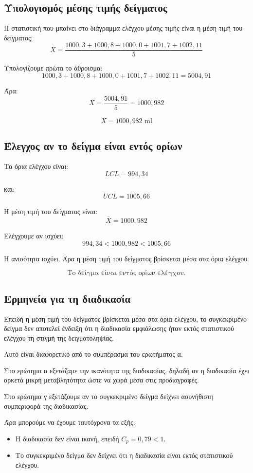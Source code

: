 \documentclass[12pt,a4paper]{article}
\begin{document}
\subsection{Υπολογισμός μέσης τιμής δείγματος}

Η στατιστική που μπαίνει στο διάγραμμα ελέγχου μέσης τιμής είναι η μέση τιμή του δείγματος:
\[
\bar{X}=\frac{1000{,}3+1000{,}8+1000{,}0+1001{,}7+1002{,}11}{5}
\]

Υπολογίζουμε πρώτα το άθροισμα:
\[
1000{,}3+1000{,}8+1000{,}0+1001{,}7+1002{,}11=5004{,}91
\]

Άρα:
\[
\bar{X}=\frac{5004{,}91}{5}=1000{,}982
\]

\[
\boxed{\bar{X}=1000{,}982 \text{ ml}}
\]

\subsection{Έλεγχος αν το δείγμα είναι εντός ορίων}

Τα όρια ελέγχου είναι:
\[
LCL=994{,}34
\]

και:
\[
UCL=1005{,}66
\]

Η μέση τιμή του δείγματος είναι:
\[
\bar{X}=1000{,}982
\]

Ελέγχουμε αν ισχύει:
\[
994{,}34 < 1000{,}982 < 1005{,}66
\]

Η ανισότητα ισχύει. Άρα η μέση τιμή του δείγματος βρίσκεται μέσα στα όρια ελέγχου.

\[
\boxed{\text{Το δείγμα είναι εντός ορίων ελέγχου.}}
\]

\subsection{Ερμηνεία για τη διαδικασία}

Επειδή η μέση τιμή του δείγματος βρίσκεται μέσα στα όρια ελέγχου, το συγκεκριμένο δείγμα δεν αποτελεί ένδειξη ότι η διαδικασία εμφιάλωσης ήταν εκτός στατιστικού ελέγχου τη στιγμή της δειγματοληψίας.

Αυτό είναι διαφορετικό από το συμπέρασμα του ερωτήματος α.

Στο ερώτημα α εξετάζαμε την ικανότητα της διαδικασίας, δηλαδή αν η διαδικασία έχει αρκετά μικρή μεταβλητότητα ώστε να χωρά μέσα στις προδιαγραφές.

Στο ερώτημα γ εξετάζουμε αν το συγκεκριμένο δείγμα δείχνει ασυνήθιστη συμπεριφορά της διαδικασίας.

Άρα μπορούμε να έχουμε ταυτόχρονα τα εξής:

\begin{itemize}
    \item Η διαδικασία δεν είναι ικανή, επειδή \(C_p=0{,}79<1\).
    \item Το συγκεκριμένο δείγμα δεν δείχνει ότι η διαδικασία είναι εκτός στατιστικού ελέγχου.
\end{itemize}
\end{document}

